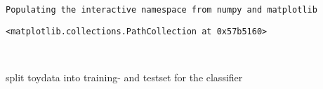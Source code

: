 \par\vspace{1\smallerfontscale}%
    \begin{addmargin}[\cellleftmargin]{0em}%
    {\smaller%
    \vspace{-1\smallerfontscale}%
    
    \begin{Verbatim}[commandchars=\\\{\}]
Populating the interactive namespace from numpy and matplotlib
    \end{Verbatim}
}%
    \end{addmargin}%
    \begin{addmargin}[\cellleftmargin]{0em}%
    {\smaller%
    \vspace{-1\smallerfontscale}%
    
    
    
    \begin{verbatim}
<matplotlib.collections.PathCollection at 0x57b5160>
    \end{verbatim}

    
}%
    \end{addmargin}%
    \begin{addmargin}[\cellleftmargin]{0em}%
    {\smaller%
    \vspace{-1\smallerfontscale}%
    
    \begin{center}
    \end{center}
    { \hspace*{\fill} \\}
    }%
    \end{addmargin}%
    split toydata into training- and testset for the classifier

